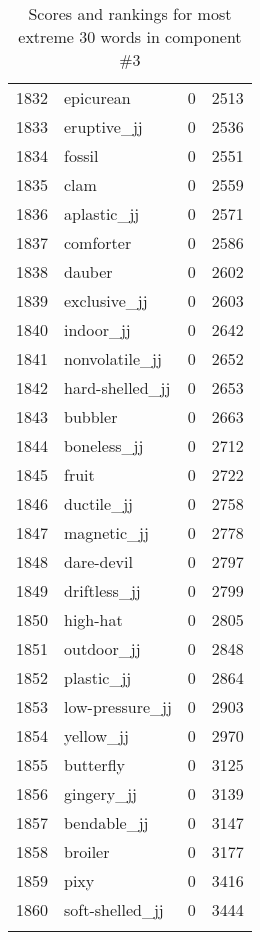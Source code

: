 \begin{longtable}[!htbp]{| rlr@{.}l |}
    1832 & epicurean & 0 & 2513 \\
    1833 & eruptive\_jj & 0 & 2536 \\
    1834 & fossil & 0 & 2551 \\
    1835 & clam & 0 & 2559 \\
    1836 & aplastic\_jj & 0 & 2571 \\
    1837 & comforter & 0 & 2586 \\
    1838 & dauber & 0 & 2602 \\
    1839 & exclusive\_jj & 0 & 2603 \\
    1840 & indoor\_jj & 0 & 2642 \\
    1841 & nonvolatile\_jj & 0 & 2652 \\
    1842 & hard-shelled\_jj & 0 & 2653 \\
    1843 & bubbler & 0 & 2663 \\
    1844 & boneless\_jj & 0 & 2712 \\
    1845 & fruit & 0 & 2722 \\
    1846 & ductile\_jj & 0 & 2758 \\
    1847 & magnetic\_jj & 0 & 2778 \\
    1848 & dare-devil & 0 & 2797 \\
    1849 & driftless\_jj & 0 & 2799 \\
    1850 & high-hat & 0 & 2805 \\
    1851 & outdoor\_jj & 0 & 2848 \\
    1852 & plastic\_jj & 0 & 2864 \\
    1853 & low-pressure\_jj & 0 & 2903 \\
    1854 & yellow\_jj & 0 & 2970 \\
    1855 & butterfly & 0 & 3125 \\
    1856 & gingery\_jj & 0 & 3139 \\
    1857 & bendable\_jj & 0 & 3147 \\
    1858 & broiler & 0 & 3177 \\
    1859 & pixy & 0 & 3416 \\
    1860 & soft-shelled\_jj & 0 & 3444 \\
    \hline
    \caption{Scores and rankings for most extreme 30 words in component \#3} \\
\end{longtable}
